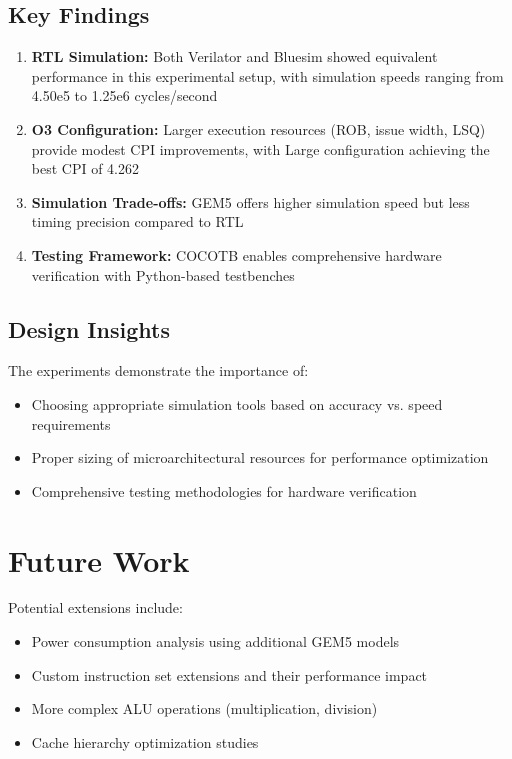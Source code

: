 \documentclass[11pt]{article}
\begin{document}
\subsection{Key Findings}

\begin{enumerate}
    \item \textbf{RTL Simulation:} Both Verilator and Bluesim showed equivalent performance in this experimental setup, with simulation speeds ranging from 4.50e5 to 1.25e6 cycles/second
    \item \textbf{O3 Configuration:} Larger execution resources (ROB, issue width, LSQ) provide modest CPI improvements, with Large configuration achieving the best CPI of 4.262
    \item \textbf{Simulation Trade-offs:} GEM5 offers higher simulation speed but less timing precision compared to RTL
    \item \textbf{Testing Framework:} COCOTB enables comprehensive hardware verification with Python-based testbenches
\end{enumerate}

\subsection{Design Insights}

The experiments demonstrate the importance of:
\begin{itemize}
    \item Choosing appropriate simulation tools based on accuracy vs. speed requirements
    \item Proper sizing of microarchitectural resources for performance optimization
    \item Comprehensive testing methodologies for hardware verification
\end{itemize}

\section{Future Work}

Potential extensions include:
\begin{itemize}
    \item Power consumption analysis using additional GEM5 models
    \item Custom instruction set extensions and their performance impact
    \item More complex ALU operations (multiplication, division)
    \item Cache hierarchy optimization studies
\end{itemize}
\end{document}
